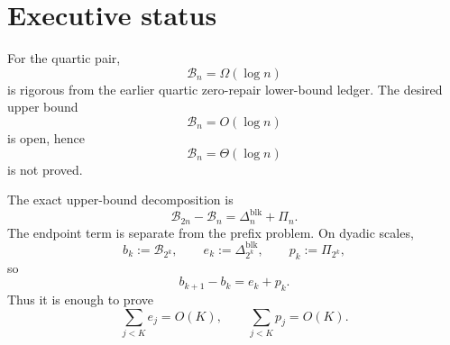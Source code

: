 \documentclass[11pt,a4paper]{article}
\newcommand{\Bcal}{\mathcal B}
\newcommand{\blk}{\mathrm{blk}}
\begin{document}
\tableofcontents
\newpage

\section{Executive status}

For the quartic pair,
\[
\boxed{\Bcal_n=\Omega(\log n)}
\]
is rigorous from the earlier quartic zero-repair lower-bound ledger.
The desired upper bound
\[
\boxed{\Bcal_n=O(\log n)}
\]
is open, hence
\[
\boxed{\Bcal_n=\Theta(\log n)}
\]
is not proved.

The exact upper-bound decomposition is
\[
\boxed{
\Bcal_{2n}-\Bcal_n
=
\Delta_n^{\blk}+\Pi_n.
}
\tag{1}
\]
The endpoint term is separate from the prefix problem.
On dyadic scales,
\[
b_k:=\Bcal_{2^k},
\qquad
e_k:=\Delta_{2^k}^{\blk},
\qquad
p_k:=\Pi_{2^k},
\]
so
\[
b_{k+1}-b_k=e_k+p_k.
\]
Thus it is enough to prove
\[
\boxed{
\sum_{j<K}e_j=O(K),
\qquad
\sum_{j<K}p_j=O(K).
}
\tag{2}
\]
\end{document}

